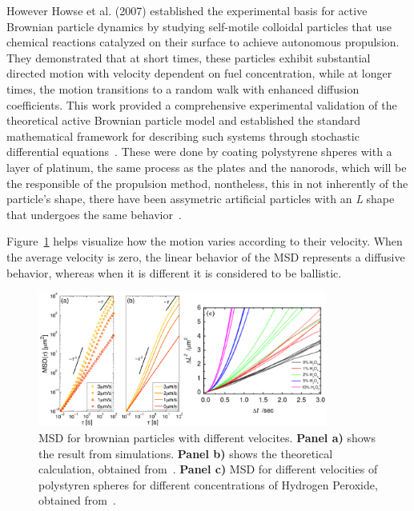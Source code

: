 However Howse et al. (2007) established the experimental basis for active Brownian particle dynamics by studying self-motile colloidal particles that use chemical reactions catalyzed on their surface to achieve autonomous propulsion. They demonstrated that at short times, these particles exhibit substantial directed motion with velocity dependent on fuel concentration, while at longer times, the motion transitions to a random walk with enhanced diffusion coefficients. This work provided a comprehensive experimental validation of the theoretical active Brownian particle model and established the standard mathematical framework for describing such systems through stochastic differential equations~\cite{howse2007self, palacci2010sedimentation}. These were done by coating polystyrene shperes with a layer of platinum, the same process as the plates and the nanorods, which will be the responsible of the propulsion method, nontheless, this in not inherently of the particle's shape, there have been assymetric artificial particles with an \textit{L} shape that undergoes the same behavior~\cite{kummel2013circular}.

Figure~\ref{fig:msddifferentvelocities} helps visualize how  the motion varies according to their velocity. When the average velocity is zero, the linear behavior of the MSD represents a diffusive behavior, whereas when it is different it is considered to be ballistic. 

\begin{figure}[h]
  \begin{center}
    \includegraphics[width=0.85\textwidth]{figures/msdmicroscopicagents.pdf}
  \end{center}
  \caption[MSD for brownian particles]{MSD for brownian particles with different velocites. \textbf{Panel a)} shows the result from simulations. \textbf{Panel b)} shows the theoretical calculation, obtained from~\cite{volpe2014simulation}. \textbf{Panel c)} MSD for different velocities of polystyren spheres for different concentrations of Hydrogen Peroxide, obtained from~\cite{howse2007self}.}\label{fig:msddifferentvelocities}
\end{figure}

